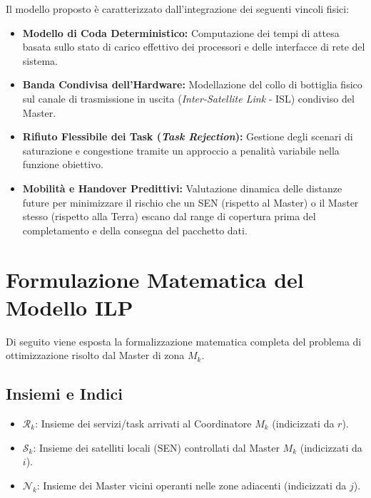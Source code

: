 \documentclass[12pt]{article}
\begin{document}
Il modello proposto è caratterizzato dall'integrazione dei seguenti vincoli fisici:
\begin{itemize}
    \item \textbf{Modello di Coda Deterministico:} Computazione dei tempi di attesa basata sullo stato di carico effettivo dei processori e delle interfacce di rete del sistema.
    \item \textbf{Banda Condivisa dell'Hardware:} Modellazione del collo di bottiglia fisico sul canale di trasmissione in uscita (\textit{Inter-Satellite Link} - ISL) condiviso del Master.
    \item \textbf{Rifiuto Flessibile dei Task (\textit{Task Rejection}):} Gestione degli scenari di saturazione e congestione tramite un approccio a penalit\`a variabile nella funzione obiettivo.
    \item \textbf{Mobilit\`a e Handover Predittivi:} Valutazione dinamica delle distanze future per minimizzare il rischio che un SEN (rispetto al Master) o il Master stesso (rispetto alla Terra) escano dal range di copertura prima del completamento e della consegna del pacchetto dati.
\end{itemize}

\section{Formulazione Matematica del Modello ILP}

Di seguito viene esposta la formalizzazione matematica completa del problema di ottimizzazione risolto dal Master di zona $M_k$.

\subsection{Insiemi e Indici}
\begin{itemize}
    \item $\mathcal{R}_k$: Insieme dei servizi/task arrivati al Coordinatore $M_k$ (indicizzati da $r$).
    \item $\mathcal{S}_k$: Insieme dei satelliti locali (SEN) controllati dal Master $M_k$ (indicizzati da $i$).
    \item $\mathcal{N}_k$: Insieme dei Master vicini operanti nelle zone adiacenti (indicizzati da $j$).
\end{itemize}
\end{document}
